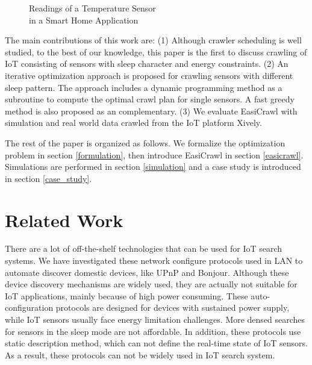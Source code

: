 \documentclass[conference]{IEEEtran}
\begin{document}
\begin{figure}
	\centering
	\hspace{-3.0em}
	
	\captionsetup{justification=centering}
	\caption{Readings of a Temperature Sensor\\ in a Smart Home Application}
	\vspace{-1.0em}
	\label{fig:smarthome}
\end{figure}

The main contributions of this work are:
(1) Although crawler scheduling is well studied, to the best of our knowledge, this paper is the first to discuss crawling of IoT consisting of sensors with sleep character and energy constraints.
(2) An iterative optimization approach is proposed for crawling sensors with different sleep pattern. 
The approach includes a dynamic programming method as a subroutine to compute the optimal crawl plan for single sensors. 
A fast greedy method is also proposed as an complementary.
(3) We evaluate EasiCrawl with simulation and real world data crawled from the IoT platform Xively\cite{xively}.

The rest of the paper is organized as follows. 
We formalize the optimization problem in section \ref{formulation}, then introduce EasiCrawl in section \ref{easicrawl}. 
Simulations are performed in section \ref{simulation} and a case study is introduced in section \ref{case_study}. 

\section{Related Work}\label{related_work}

There are a lot of off-the-shelf technologies that can be used for IoT search systems.
We have investigated these network configure protocols used in LAN to automate discover domestic devices, like UPnP\cite{UPnP} and Bonjour\cite{Bonjour}.
Although these device discovery mechanisms are widely used, they are actually not suitable for IoT applications, mainly because of high power consuming. 
These auto-configuration protocols are designed for devices with sustained power supply, while IoT sensors usually face energy limitation challenges.
More densed searches for sensors in the sleep mode are not affordable.
In addition, these protocols use static description method, which can not define the real-time state of IoT sensors.
As a result, these protocols can not be widely used in IoT search system.
\end{document}
